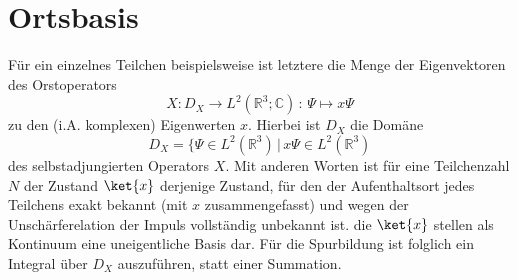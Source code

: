 % 
% 
% 
% 

\chapter{Ortsbasis}
\label{sec:A_1}
Für ein einzelnes Teilchen beispielsweise ist letztere die Menge der Eigenvektoren des Orstoperators
\begin{equation*}
  X:D_X \rightarrow L^2(\mathbb{R}^3;\mathbb{C}) \, : \, \Psi \mapsto x\Psi
\end{equation*}
zu den (i.A. komplexen) Eigenwerten $x$. Hierbei ist $D_X$ die Domäne
\begin{equation*}
  D_X = \{\Psi \in L^2(\mathbb{R}^3) \, | \, x\Psi \in L^2(\mathbb{R}^3)
\end{equation*}
des selbstadjungierten Operators $X$. Mit anderen Worten ist für eine Teilchenzahl $N$ der Zustand $\ket{x}$ derjenige Zustand, für den der Aufenthaltsort jedes Teilchens exakt bekannt (mit $x$ zusammengefasst) und wegen der Unschärferelation der Impuls vollständig unbekannt ist.
die $\ket{x}$ stellen als Kontinuum eine uneigentliche Basis dar. Für die Spurbildung ist folglich ein Integral über $D_X$ auszuführen, statt einer Summation.
